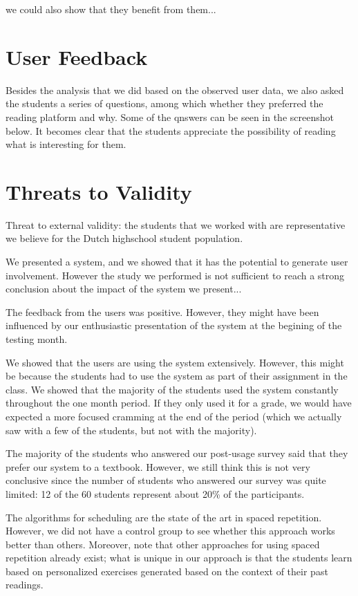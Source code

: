 we could also show that they benefit from them... 



\section{User Feedback}

Besides the analysis that we did based on the observed user data, we also asked the students a series of questions, among which whether they preferred the reading platform and why. Some of the qnswers can be seen in the screenshot below. It becomes clear that the students appreciate the possibility of reading what is interesting for them.


\section{Threats to Validity}

Threat to external validity: the students that we worked with are representative we believe for the Dutch highschool student population. 

We presented a system, and we showed that it has the potential to generate user involvement. However the study we performed is not sufficient to reach a strong conclusion about the impact of the system we present... 

The feedback from the users was positive. However, they might have been influenced by our enthusiastic presentation of the system at the begining of the testing month. 

We showed that the users are using the system extensively. However, this might be because the students had to use the system as part of their assignment in the class. We showed that the majority of the students used the system constantly throughout the one month period. If they only used it for a grade, we would have expected a more focused cramming at the end of the period (which we actually saw with a few of the students, but not with the majority). 

The majority of the students who answered our post-usage survey said that  they prefer our system to a textbook. However, we still think this is not very conclusive since the number of students who answered our survey was quite limited: 12 of the 60 students represent about 20\% of the participants. 


The algorithms for scheduling are the state of the art in spaced repetition. However, we did not have a control group to see whether this approach works better than others. Moreover, note that other approaches for using spaced repetition already exist; what is unique in our approach is that the students learn based on personalized exercises generated based on the context of their past readings.


